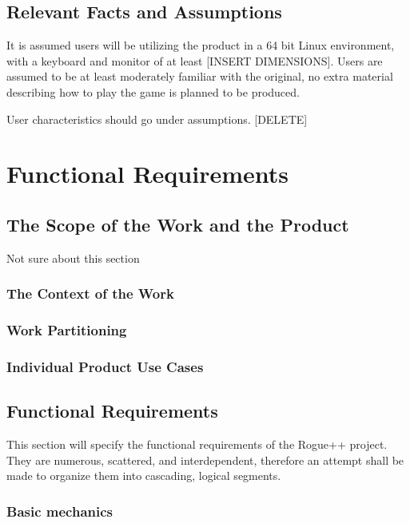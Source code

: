 \documentclass[12pt, titlepage]{article}
\begin{document}
	\subsection{Relevant Facts and Assumptions}

It is assumed users will be utilizing the product in a 64 bit Linux environment, with a keyboard and monitor of at least [INSERT DIMENSIONS]. Users are assumed to be at least moderately familiar with the original, no extra material describing how to play the game is planned to be produced.

User characteristics should go under assumptions. [DELETE]

\section{Functional Requirements}

	\subsection{The Scope of the Work and the Product}

		Not sure about this section

		\subsubsection{The Context of the Work}

		\subsubsection{Work Partitioning}

		\subsubsection{Individual Product Use Cases}

	\subsection{Functional Requirements}

	This section will specify the functional requirements of the Rogue++ project. They are numerous, scattered, and interdependent, therefore an attempt shall be made to organize them into cascading, logical segments.

		\subsubsection{Basic mechanics}
\end{document}
